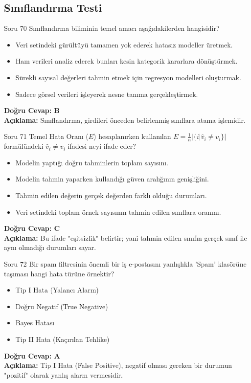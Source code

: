 \documentclass[12pt,a4paper]{article}
\begin{document}
\newpage
\subsection{Sınıflandırma Testi}

\begin{testcard}{Soru 70}
    Sınıflandırma biliminin temel amacı aşağıdakilerden hangisidir?
    \begin{itemize}
        \item[A)] Veri setindeki gürültüyü tamamen yok ederek hatasız modeller üretmek.
        \item[B)] Ham verileri analiz ederek bunları kesin kategorik kararlara dönüştürmek.
        \item[C)] Sürekli sayısal değerleri tahmin etmek için regresyon modelleri oluşturmak.
        \item[D)] Sadece görsel verileri işleyerek nesne tanıma gerçekleştirmek.
    \end{itemize}
    \tcblower
    \textbf{Doğru Cevap: B} \\
    \textbf{Açıklama:} Sınıflandırma, girdileri önceden belirlenmiş sınıflara atama işlemidir.
\end{testcard}

\begin{testcard}{Soru 71}
    Temel Hata Oranı ($E$) hesaplanırken kullanılan $E = \frac{1}{n} |\{i | \hat{v}_i \neq v_i\}|$ formülündeki $\hat{v}_i \neq v_i$ ifadesi neyi ifade eder?
    \begin{itemize}
        \item[A)] Modelin yaptığı doğru tahminlerin toplam sayısını.
        \item[B)] Modelin tahmin yaparken kullandığı güven aralığının genişliğini.
        \item[C)] Tahmin edilen değerin gerçek değerden farklı olduğu durumları.
        \item[D)] Veri setindeki toplam örnek sayısının tahmin edilen sınıflara oranını.
    \end{itemize}
    \tcblower
    \textbf{Doğru Cevap: C} \\
    \textbf{Açıklama:} Bu ifade "eşitsizlik" belirtir; yani tahmin edilen sınıfın gerçek sınıf ile aynı olmadığı durumları sayar.
\end{testcard}

\begin{testcard}{Soru 72}
    Bir spam filtresinin önemli bir iş e-postasını yanlışlıkla 'Spam' klasörüne taşıması hangi hata türüne örnektir?
    \begin{itemize}
        \item[A)] Tip I Hata (Yalancı Alarm)
        \item[B)] Doğru Negatif (True Negative)
        \item[C)] Bayes Hatası
        \item[D)] Tip II Hata (Kaçırılan Tehlike)
    \end{itemize}
    \tcblower
    \textbf{Doğru Cevap: A} \\
    \textbf{Açıklama:} Tip I Hata (False Positive), negatif olması gereken bir durumun "pozitif" olarak yanlış alarm vermesidir.
\end{testcard}
\end{document}
